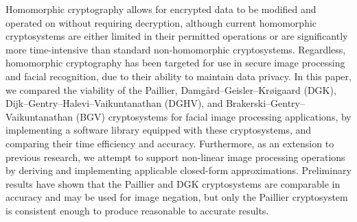 \begin{thesisabstract}
    \noindent
    Homomorphic cryptography allows for encrypted data to be modified and operated on without requiring decryption, although current homomorphic cryptosystems are either limited in their permitted operations or are significantly more time-intensive than standard non-homomorphic cryptosystems. Regardless, homomorphic cryptography has been targeted for use in secure image processing and facial recognition, due to their ability to maintain data privacy. In this paper, we compared the viability of the Paillier, Damg{\aa}rd--Geisler--Kr{\o}igaard (DGK), Dijk--Gentry--Halevi--Vaikuntanathan (DGHV), and Brakerski--Gentry--Vaikuntanathan (BGV) cryptosystems for facial image processing applications, by implementing a software library equipped with these cryptosystems, and comparing their time efficiency and accuracy. Furthermore, as an extension to previous research, we attempt to support non-linear image processing operations by deriving and implementing applicable closed-form approximations. Preliminary results have shown that the Paillier and DGK cryptosystems are comparable in accuracy and may be used for image negation, but only the Paillier cryptosystem is consistent enough to produce reasonable to accurate results.

\end{thesisabstract}
